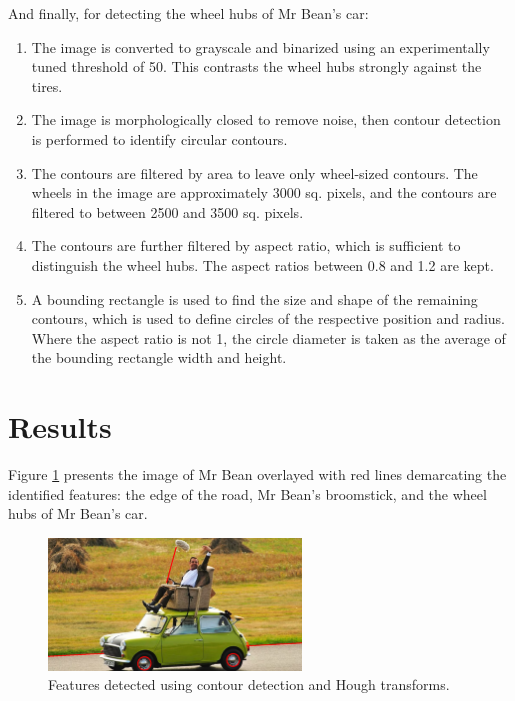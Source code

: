 And finally, for detecting the wheel hubs of Mr Bean's car:
\begin{enumerate}
  \item The image is converted to grayscale and binarized using an experimentally tuned threshold of 50. This contrasts the wheel hubs strongly against the tires.

  \item The image is morphologically closed to remove noise, then contour detection is performed to identify circular contours.

  \item The contours are filtered by area to leave only wheel-sized contours. The wheels in the image are approximately 3000 sq. pixels, and the contours are filtered to between 2500 and 3500 sq. pixels.

  \item The contours are further filtered by aspect ratio, which is sufficient to distinguish the wheel hubs. The aspect ratios between 0.8 and 1.2 are kept.

  \item A bounding rectangle is used to find the size and shape of the remaining contours, which is used to define circles of the respective position and radius. Where the aspect ratio is not 1, the circle diameter is taken as the average of the bounding rectangle width and height.

\end{enumerate}

\section{Results}

Figure \ref{fig:q3results} presents the image of Mr Bean overlayed with red lines demarcating the identified features: the edge of the road, Mr Bean's broomstick, and the wheel hubs of Mr Bean's car.

\begin{figure}[ht]
  \centering
  \includegraphics[width=0.6\textwidth]{images/q3_results.png}
  \caption{Features detected using contour detection and Hough transforms.}
  \label{fig:q3results}
\end{figure}

